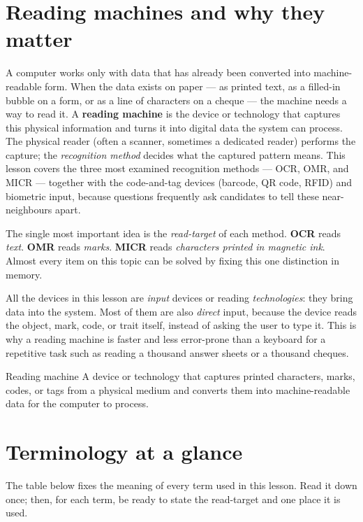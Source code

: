 \section{Reading machines and why they matter}
A computer works only with data that has already been converted into
machine-readable form. When the data exists on paper --- as printed text, as
a filled-in bubble on a form, or as a line of characters on a cheque --- the
machine needs a way to read it. A \textbf{reading machine} is the device or
technology that captures this physical information and turns it into digital
data the system can process. The physical reader (often a scanner, sometimes
a dedicated reader) performs the capture; the \emph{recognition method}
decides what the captured pattern means. This lesson covers the three most
examined recognition methods --- OCR, OMR, and MICR --- together with the
code-and-tag devices (barcode, QR code, RFID) and biometric input, because
questions frequently ask candidates to tell these near-neighbours apart.

The single most important idea is the \emph{read-target} of each method.
\textbf{OCR} reads \emph{text}. \textbf{OMR} reads \emph{marks}.
\textbf{MICR} reads \emph{characters printed in magnetic ink}. Almost every
item on this topic can be solved by fixing this one distinction in memory.

All the devices in this lesson are \emph{input} devices or reading
\emph{technologies}: they bring data into the system. Most of them are also
\emph{direct} input, because the device reads the object, mark, code, or
trait itself, instead of asking the user to type it. This is why a reading
machine is faster and less error-prone than a keyboard for a repetitive task
such as reading a thousand answer sheets or a thousand cheques.

\begin{definitionbox}{Reading machine}
A device or technology that captures printed characters, marks, codes, or
tags from a physical medium and converts them into machine-readable data for
the computer to process.
\end{definitionbox}

\section{Terminology at a glance}
The table below fixes the meaning of every term used in this lesson. Read it
down once; then, for each term, be ready to state the read-target and one
place it is used.

